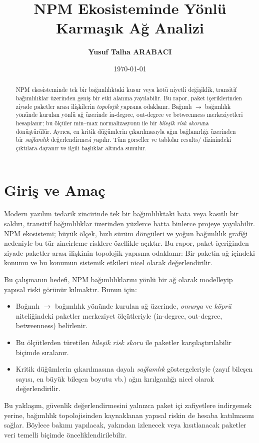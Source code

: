 \documentclass[11pt,a4paper]{article}
\title{NPM Ekosisteminde Yönlü Karmaşık Ağ Analizi}
\author{\textbf{Yusuf Talha ARABACI}}
\date{\today}
\begin{document}
\maketitle

\begin{abstract}
NPM ekosisteminde tek bir bağımlılıktaki kusur veya kötü niyetli değişiklik, transitif bağımlılıklar üzerinden geniş bir etki alanına yayılabilir. Bu rapor, paket içeriklerinden ziyade paketler arası ilişkilerin \emph{topolojik} yapısına odaklanır. Bağımlı $\to$ bağımlılık yönünde kurulan yönlü ağ üzerinde in-degree, out-degree ve betweenness merkeziyetleri hesaplanır; bu ölçüler min--max normalizasyonu ile bir \emph{bileşik risk skoru}na dönüştürülür. Ayrıca, en kritik düğümlerin çıkarılmasıyla ağın bağlanırlığı üzerinden bir \emph{sağlamlık} değerlendirmesi yapılır. Tüm görseller ve tablolar results/ dizinindeki çıktılara dayanır ve ilgili başlıklar altında sunulur.
\end{abstract}

\clearpage

\section{Giriş ve Amaç}
Modern yazılım tedarik zincirinde tek bir bağımlılıktaki hata veya kasıtlı bir saldırı, transitif bağımlılıklar üzerinden yüzlerce hatta binlerce projeye yayılabilir. NPM ekosistemi; büyük ölçek, hızlı sürüm döngüleri ve yoğun bağımlılık grafiği nedeniyle bu tür zincirleme risklere özellikle açıktır. Bu rapor, paket içeriğinden ziyade paketler arası ilişkinin topolojik yapısına odaklanır: Bir paketin ağ içindeki konumu ve bu konumun sistemik etkileri nicel olarak değerlendirilir.

Bu çalışmanın hedefi, NPM bağımlılıklarını yönlü bir ağ olarak modelleyip yapısal riski görünür kılmaktır. Bunun için:
\begin{itemize}
  \item Bağımlı $\to$ bağımlılık yönünde kurulan ağ üzerinde, \emph{omurga} ve \emph{köprü} niteliğindeki paketler merkeziyet ölçütleriyle (in-degree, out-degree, betweenness) belirlenir.
  \item Bu ölçütlerden türetilen \emph{bileşik risk skoru} ile paketler karşılaştırılabilir biçimde sıralanır.
  \item Kritik düğümlerin çıkarılmasına dayalı \emph{sağlamlık} göstergeleriyle (zayıf bileşen sayısı, en büyük bileşen boyutu vb.) ağın kırılganlığı nicel olarak değerlendirilir.
\end{itemize}
Bu yaklaşım, güvenlik değerlendirmesini yalnızca paket içi zafiyetlere indirgemek yerine, bağımlılık topolojisinden kaynaklanan yapısal riskin de hesaba katılmasını sağlar. Böylece bakımı yapılacak, yakından izlenecek veya kısıtlanacak paketler veri temelli biçimde önceliklendirilebilir.
\end{document}

